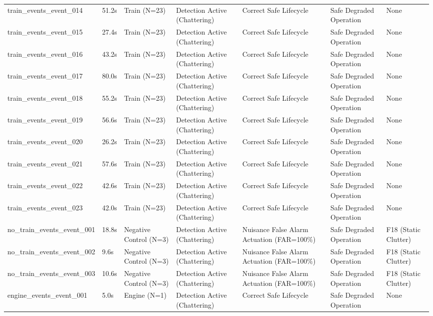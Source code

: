 \begin{table}[t]
\begin{tabular}{lllllll}
train\_events\_event\_014 & 51.2s & Train (N=23) & Detection Active (Chattering) & Correct Safe Lifecycle & Safe Degraded Operation & None \\
train\_events\_event\_015 & 27.4s & Train (N=23) & Detection Active (Chattering) & Correct Safe Lifecycle & Safe Degraded Operation & None \\
train\_events\_event\_016 & 43.2s & Train (N=23) & Detection Active (Chattering) & Correct Safe Lifecycle & Safe Degraded Operation & None \\
train\_events\_event\_017 & 80.0s & Train (N=23) & Detection Active (Chattering) & Correct Safe Lifecycle & Safe Degraded Operation & None \\
train\_events\_event\_018 & 55.2s & Train (N=23) & Detection Active (Chattering) & Correct Safe Lifecycle & Safe Degraded Operation & None \\
train\_events\_event\_019 & 56.6s & Train (N=23) & Detection Active (Chattering) & Correct Safe Lifecycle & Safe Degraded Operation & None \\
train\_events\_event\_020 & 26.2s & Train (N=23) & Detection Active (Chattering) & Correct Safe Lifecycle & Safe Degraded Operation & None \\
train\_events\_event\_021 & 57.6s & Train (N=23) & Detection Active (Chattering) & Correct Safe Lifecycle & Safe Degraded Operation & None \\
train\_events\_event\_022 & 42.6s & Train (N=23) & Detection Active (Chattering) & Correct Safe Lifecycle & Safe Degraded Operation & None \\
train\_events\_event\_023 & 42.0s & Train (N=23) & Detection Active (Chattering) & Correct Safe Lifecycle & Safe Degraded Operation & None \\
no\_train\_events\_event\_001 & 18.8s & Negative Control (N=3) & Detection Active (Chattering) & Nuisance False Alarm Actuation (FAR=100\%) & Safe Degraded Operation & F18 (Static Clutter) \\
no\_train\_events\_event\_002 & 9.6s & Negative Control (N=3) & Detection Active (Chattering) & Nuisance False Alarm Actuation (FAR=100\%) & Safe Degraded Operation & F18 (Static Clutter) \\
no\_train\_events\_event\_003 & 10.6s & Negative Control (N=3) & Detection Active (Chattering) & Nuisance False Alarm Actuation (FAR=100\%) & Safe Degraded Operation & F18 (Static Clutter) \\
engine\_events\_event\_001 & 5.0s & Engine (N=1) & Detection Active (Chattering) & Correct Safe Lifecycle & Safe Degraded Operation & None \\
\hline
\end{tabular}
\end{table}
